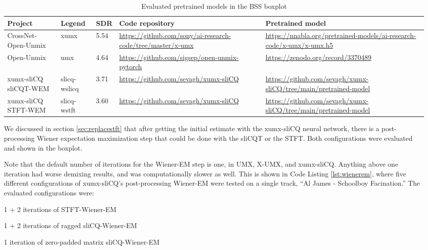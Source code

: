 \documentclass[report.tex]{subfiles}
\begin{document}
\begin{table}[ht]
	\centering
	\caption{Evaluated pretrained models in the BSS boxplot}
	\label{table:bsseval}
	\begin{tabular}{ |p{2.5cm}|l|l|p{3.5cm}|p{3.5cm}| }
	 \hline
		Project & Legend & SDR & Code repository & Pretrained model \\
	 \hline
	 \hline
		CrossNet-Open-Unmix & xumx & 5.54 & \url{https://github.com/sony/ai-research-code/tree/master/x-umx} & \url{https://nnabla.org/pretrained-models/ai-research-code/x-umx/x-umx.h5} \\
	 \hline
		Open-Unmix & umx & 4.64 & \url{https://github.com/sigsep/open-unmix-pytorch} & \url{https://zenodo.org/record/3370489} \\
	 \hline
		\makecell[l]{xumx-sliCQ \\ sliCQT-WEM} & slicq-wslicq & 3.71 & \url{https://github.com/sevagh/xumx-sliCQ} & \url{https://github.com/sevagh/xumx-sliCQ/tree/main/pretrained-model} \\
	 \hline
		\makecell[l]{xumx-sliCQ \\ STFT-WEM} & slicq-wstft & 3.60 & \url{https://github.com/sevagh/xumx-sliCQ} & \url{https://github.com/sevagh/xumx-sliCQ/tree/main/pretrained-model} \\
	 \hline
\end{tabular}
\end{table}

We discussed in section \ref{sec:replacestft} that after getting the initial estimate with the xumx-sliCQ neural network, there is a post-processing Wiener expectation maximization step that could be done with the sliCQT or the STFT. Both configurations were evaluated and shown in the boxplot.

Note that the default number of iterations for the Wiener-EM step is one, in UMX, X-UMX, and xumx-sliCQ. Anything above one iteration had worse demixing results, and was computationally slower as well. This is shown in Code Listing \ref{lst:wienerem}, where five different configurations of xumx-sliCQ's post-processing Wiener-EM were tested on a single track, ``Al James - Schoolboy Facination.'' The evaluated configurations were:
\begin{tight_enumerate}
	\item
		1 + 2 iterations of STFT-Wiener-EM
	\item
		1 + 2 iterations of ragged sliCQ-Wiener-EM
	\item
		1 iteration of zero-padded matrix sliCQ-Wiener-EM
\end{tight_enumerate}
\end{document}
